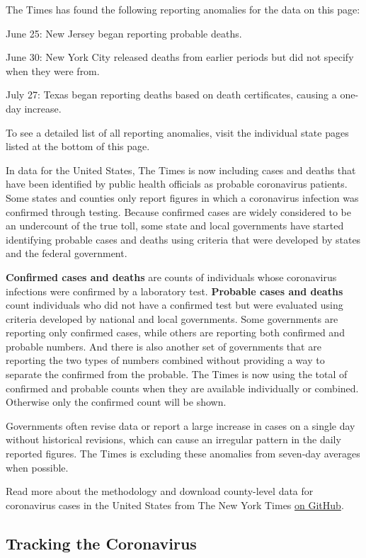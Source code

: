 The Times has found the following reporting anomalies for the data on
this page:

June 25: New Jersey began reporting probable deaths.

June 30: New York City released deaths from earlier periods but did not
specify when they were from.

July 27: Texas began reporting deaths based on death certificates,
causing a one-day increase.

To see a detailed list of all reporting anomalies, visit the individual
state pages listed at the bottom of this page.

In data for the United States, The Times is now including cases and
deaths that have been identified by public health officials as probable
coronavirus patients. Some states and counties only report figures in
which a coronavirus infection was confirmed through testing. Because
confirmed cases are widely considered to be an undercount of the true
toll, some state and local governments have started identifying probable
cases and deaths using criteria that were developed by states and the
federal government.

\textbf{Confirmed cases and deaths} are counts of individuals whose
coronavirus infections were confirmed by a laboratory test.
\textbf{Probable cases and deaths} count individuals who did not have a
confirmed test but were evaluated using criteria developed by national
and local governments. Some governments are reporting only confirmed
cases, while others are reporting both confirmed and probable numbers.
And there is also another set of governments that are reporting the two
types of numbers combined without providing a way to separate the
confirmed from the probable. The Times is now using the total of
confirmed and probable counts when they are available individually or
combined. Otherwise only the confirmed count will be shown.

Governments often revise data or report a large increase in cases on a
single day without historical revisions, which can cause an irregular
pattern in the daily reported figures. The Times is excluding these
anomalies from seven-day averages when possible.

Read more about the methodology and download county-level data for
coronavirus cases in the United States from The New York Times
\href{https://github.com/nytimes/covid-19-data}{on GitHub}.

\hypertarget{tracking-the-coronavirus}{%
\subsection{Tracking the Coronavirus}\label{tracking-the-coronavirus}}

